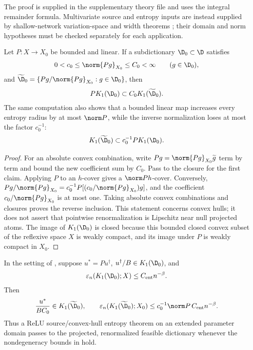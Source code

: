 The proof is supplied in the supplementary theory file and uses the integral remainder formula. Multivariate source and
entropy inputs are instead supplied by shallow-network variation-space and width theorems
\citep{SiegelXuVariation2023,SiegelXuSharp2024,MaoSiegelXu2026}; their domain and norm hypotheses
must be checked separately for each application.

\begin{lemma}
\label{lem:projection}
Let \(P:X\to X_0\) be bounded and linear. If a subdictionary \(\D_0\subset\D\) satisfies
\[
 0<c_0\leq\norm{Pg}_{X_0}\leq C_0<\infty\qquad(g\in\D_0),
\]
and \(\widetilde\D_0=\{Pg/\norm{Pg}_{X_0}:g\in\D_0\}\), then
\[
 P K_1(\D_0)\subset C_0K_1(\widetilde\D_0).
\]
The same computation also shows that a bounded linear map increases every entropy radius by at most
\(\norm P\), while the inverse normalization loses at most the factor \(c_0^{-1}\):
\[
 K_1(\widetilde\D_0)\subset c_0^{-1}P K_1(\D_0).
\]
\end{lemma}

\begin{proof}
For an absolute convex combination, write
\(Pg=\norm{Pg}_{X_0}\widetilde g\) term by term and bound the new coefficient sum by \(C_0\).
Pass to the closure for the first claim. Applying \(P\) to an \(h\)-cover gives a
\(\norm P h\)-cover. Conversely,
\(Pg/\norm{Pg}_{X_0}=c_0^{-1}P[(c_0/\norm{Pg}_{X_0})g]\), and the coefficient
\(c_0/\norm{Pg}_{X_0}\) is at most one. Taking absolute convex combinations and closures proves the
reverse inclusion. This statement concerns convex hulls; it does not assert that pointwise
renormalization is Lipschitz near null projected atoms. The image of \(K_1(\D_0)\) is closed because
this bounded closed convex subset of the reflexive space \(X\) is weakly compact, and its image
under \(P\) is weakly compact in \(X_0\).
\end{proof}

\begin{corollary}
\label{cor:projected-source-entropy}
In the setting of , suppose \(u^*=Pu^\dagger\),
\(u^\dagger/B\in K_1(\D_0)\), and
\[
 \varepsilon_n(K_1(\D_0);X)\leq C_{\rm ent}n^{-\beta}.
\]
Then
\[
 \frac{u^*}{BC_0}\in K_1(\widetilde\D_0),
 \qquad
 \varepsilon_n(K_1(\widetilde\D_0);X_0)
 \leq c_0^{-1}\norm P\,C_{\rm ent}n^{-\beta}.
\]
Thus a ReLU source/convex-hull entropy theorem on an extended parameter domain passes to the projected,
renormalized feasible dictionary whenever the nondegeneracy bounds in  hold.
\end{corollary}

